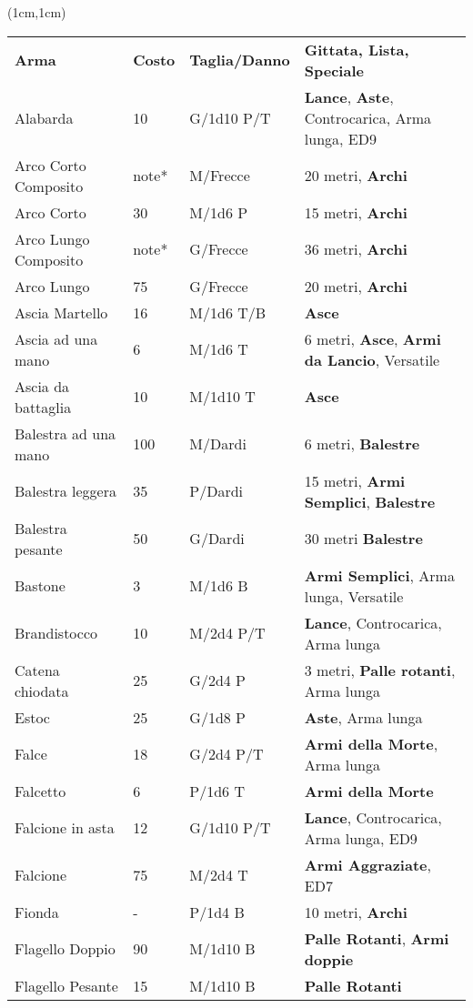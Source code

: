 \documentclass[a4paper,12 pt,openany]{book}
\begin{document}
\begin{textblock*}{19.5cm}(1cm,1cm) %

\begin{tabularx}{0.95\textwidth}{llll}
\textbf{Arma}&\textbf{Costo}&\textbf{Taglia/Danno} & \textbf{Gittata, Lista, Speciale}\\
Alabarda& 10 & G/1d10 P/T& \textbf{Lance}, \textbf{Aste}, Controcarica, Arma lunga, ED9 \\
Arco Corto Composito& note*& M/Frecce& 20 metri, \textbf{Archi}\\
Arco Corto& 30 & M/1d6 P& 15 metri, \textbf{Archi}\\
Arco Lungo Composito& note*& G/Frecce& 36 metri, \textbf{Archi}\\
Arco Lungo& 75 & G/Frecce& 20 metri, \textbf{Archi}\\
Ascia Martello& 16 & M/1d6 T/B& \textbf{Asce}\\
Ascia ad una mano& 6  & M/1d6 T& 6 metri, \textbf{Asce}, \textbf{Armi da Lancio}, Versatile\\
Ascia da battaglia& 10 & M/1d10 T&\textbf{Asce}\\
Balestra ad una mano& 100& M/Dardi& 6 metri, \textbf{Balestre}\\
Balestra leggera& 35 & P/Dardi& 15 metri, \textbf{Armi Semplici}, \textbf{Balestre}\\
Balestra pesante& 50 & G/Dardi& 30 metri \textbf{Balestre}\\
Bastone& 3& M/1d6 B& \textbf{Armi Semplici}, Arma lunga, Versatile\\
Brandistocco& 10 & M/2d4 P/T& \textbf{Lance}, Controcarica, Arma lunga\\
Catena chiodata& 25 & G/2d4 P& 3 metri, \textbf{Palle rotanti}, Arma lunga\\
Estoc& 25& G/1d8 P& \textbf{Aste}, Arma lunga\\
Falce& 18 & G/2d4 P/T& \textbf{Armi della Morte}, Arma lunga\\
Falcetto& 6& P/1d6 T& \textbf{Armi della Morte}\\
Falcione in asta& 12 & G/1d10 P/T& \textbf{Lance}, Controcarica, Arma lunga, ED9\\
Falcione& 75 & M/2d4 T& \textbf{Armi Aggraziate}, ED7\\
Fionda& -& P/1d4 B& 10 metri, \textbf{Archi}\\
Flagello Doppio& 90 & M/1d10 B& \textbf{Palle Rotanti}, \textbf{Armi doppie}\\
Flagello Pesante& 15 & M/1d10 B& \textbf{Palle Rotanti}\\

\end{tabularx}
\end{textblock*}
\end{document}
